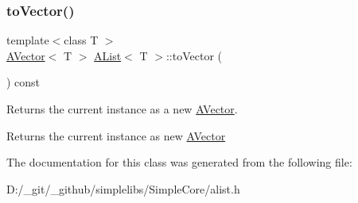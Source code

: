 \subsubsection{\texorpdfstring{toVector()}{toVector()}}
{\footnotesize\ttfamily template$<$class T $>$ \\
\mbox{\hyperlink{class_a_vector}{A\+Vector}}$<$ T $>$ \mbox{\hyperlink{class_a_list}{A\+List}}$<$ T $>$\+::to\+Vector (\begin{DoxyParamCaption}{ }\end{DoxyParamCaption}) const}



Returns the current instance as a new \mbox{\hyperlink{class_a_vector}{A\+Vector}}. 

\begin{DoxyReturn}{Returns}
the current instance as new \mbox{\hyperlink{class_a_vector}{A\+Vector}} 
\end{DoxyReturn}


The documentation for this class was generated from the following file\+:\begin{DoxyCompactItemize}
\item 
D\+:/\+\_\+git/\+\_\+github/simplelibs/\+Simple\+Core/alist.\+h\end{DoxyCompactItemize}
